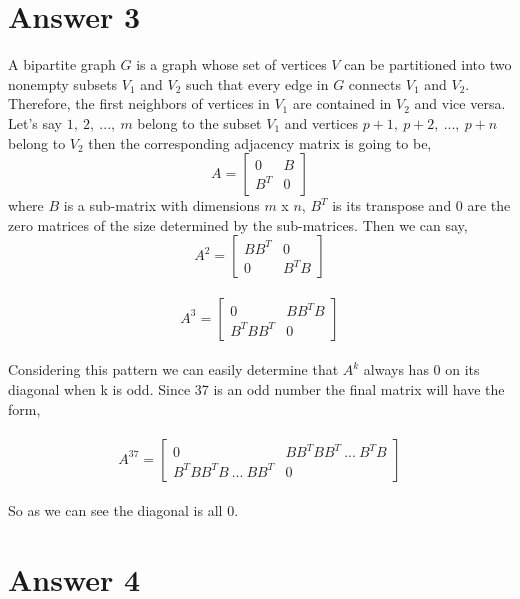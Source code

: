 \documentclass[11pt]{article}
\begin{document}
\section*{Answer 3}
A bipartite graph $G$ is a graph whose set of vertices $V$ can be partitioned into two nonempty subsets $V_1$ and $V_2$ such that every edge in $G$ connects $V_1$ and $V_2$. Therefore, the first neighbors of vertices in $V_1$ are contained in $V_2$ and vice versa. Let's say $1,\ 2,\ ...,\ m$ belong to the subset $V_1$ and vertices $p+1,\ p+2,\ ...,\ p+n$ belong to $V_2$ then the corresponding adjacency matrix is going to be,
\[
A=
  \begin{bmatrix}
    0 & B \\
    B^T & 0
  \end{bmatrix}
\] 
where $B$ is a sub-matrix with dimensions $m$ x $n$, $B^T$ is its transpose and $0$ are the zero matrices of the size determined by the sub-matrices. Then we can say,  \\
\[
A^2=
  \begin{bmatrix}
    B B^T & 0 \\
   0 & B^T B
  \end{bmatrix}
\] \\
\[
A^3=
  \begin{bmatrix}
    0 & B B^T B \\
    B^T B B^T & 0
  \end{bmatrix}
\] \\
Considering this pattern we can easily determine that $A^k$ always has 0 on its diagonal when  k is odd. Since 37 is an odd number the final matrix will have the form, \\\
\[
A^{37}=
  \begin{bmatrix}
    0 & B B^T B B^T\ ...\ B^T B \\
    B^T B B^T B\ ...\ B B^T & 0
  \end{bmatrix}
\] \\
So as we can see the diagonal is all $0$.


\section*{Answer 4}
\end{document}
